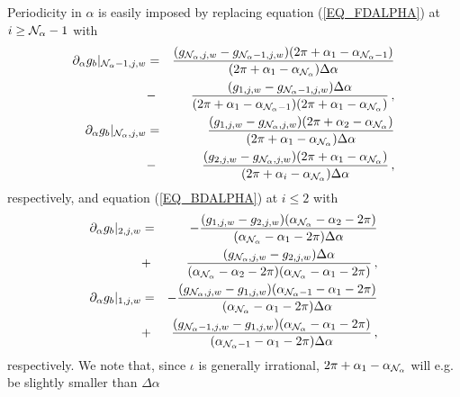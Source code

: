 Periodicity in $\alpha$ is easily imposed by replacing equation (\ref{EQ_FDALPHA}) at $i\ge{\cal{N}}_\alpha-1$ with
\begin{eqnarray}
\partial_\alpha g_b|_{{\cal{N}}_\alpha-1,j,w}&=&\frac{(g_{{\cal{N}}_\alpha,j,w}-g_{{\cal{N}}_\alpha-1,j,w})(2\pi+\alpha_1-\alpha_{{\cal{N}}_\alpha-1})}{(2\pi+\alpha_1-\alpha_{{\cal{N}}_\alpha})\Delta\alpha} \nonumber \\
&-&\frac{(g_{1,j,w}-g_{{\cal{N}}_\alpha-1,j,w})\Delta\alpha}{(2\pi+\alpha_1-\alpha_{{\cal{N}}_\alpha-1})(2\pi+\alpha_1-\alpha_{{\cal{N}}_\alpha})}\,,\label{EQ_FDALPHAA}\\
\partial_\alpha g_b|_{{\cal{N}}_\alpha,j,w}&=&\frac{(g_{1,j,w}-g_{{\cal{N}}_\alpha,j,w})(2\pi+\alpha_{2}-\alpha_{{\cal{N}}_\alpha})}{(2\pi+\alpha_{1}-\alpha_{{\cal{N}}_\alpha})\Delta\alpha} \nonumber \\
&-&\frac{(g_{2,j,w}-g_{{\cal{N}}_\alpha,j,w})(2\pi+\alpha_{1}-\alpha_{{\cal{N}}_\alpha})}{(2\pi+\alpha_{i}-\alpha_{{\cal{N}}_\alpha})\Delta\alpha}\,,\label{EQ_FDALPHAB}
\end{eqnarray}
respectively, and equation (\ref{EQ_BDALPHA}) at $i\le 2$ with
\begin{eqnarray}
\partial_\alpha g_b|_{2,j,w}&=&-\frac{(g_{1,j,w}-g_{2,j,w})(\alpha_{{\cal{N}}_\alpha}-\alpha_2-2\pi)}{(\alpha_{{\cal{N}}_\alpha}-\alpha_1-2\pi)\Delta\alpha} \nonumber \\
&+&\frac{(g_{{\cal{N}}_\alpha,j,w}-g_{2,j,w})\Delta\alpha}{(\alpha_{{\cal{N}}_\alpha}-\alpha_2-2\pi)(\alpha_{{\cal{N}}_\alpha}-\alpha_1-2\pi)}\,,\label{EQ_BDALPHAA}\\
\partial_\alpha g_b|_{1,j,w}&=&-\frac{(g_{{\cal{N}}_\alpha,j,w}-g_{1,j,w})(\alpha_{{\cal{N}}_\alpha-1}-\alpha_1-2\pi)}{(\alpha_{{\cal{N}}_\alpha}-\alpha_1-2\pi)\Delta\alpha} \nonumber \\
&+&\frac{(g_{{\cal{N}}_\alpha-1,j,w}-g_{1,j,w})(\alpha_{{\cal{N}}_\alpha}-\alpha_1-2\pi)}{(\alpha_{{\cal{N}}_\alpha-1}-\alpha_1-2\pi)\Delta\alpha}\,,
\label{EQ_BDALPHAB}
\end{eqnarray}
respectively. We note  that, since $\iota$ is generally irrational, $2\pi+\alpha_1-\alpha_{{\cal{N}}_\alpha}$ will e.g. be slightly smaller than $\Delta\alpha$


